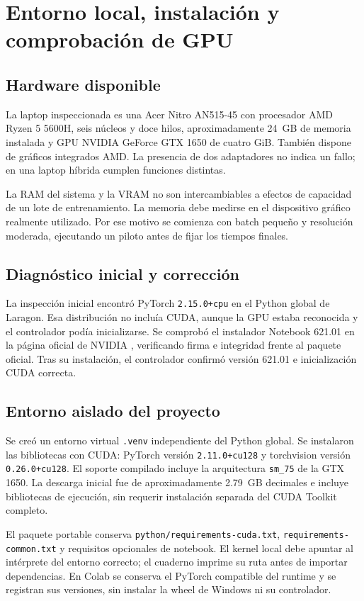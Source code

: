 \FloatBarrier\section{Entorno local, instalación y comprobación de GPU}

\subsection{Hardware disponible}
La laptop inspeccionada es una Acer Nitro AN515-45 con procesador AMD Ryzen 5 5600H, seis núcleos y doce hilos, aproximadamente 24~GB de memoria instalada y GPU NVIDIA GeForce GTX 1650 de cuatro GiB. También dispone de gráficos integrados AMD. La presencia de dos adaptadores no indica un fallo; en una laptop híbrida cumplen funciones distintas.

La RAM del sistema y la VRAM no son intercambiables a efectos de capacidad de un lote de entrenamiento. La memoria debe medirse en el dispositivo gráfico realmente utilizado. Por ese motivo se comienza con batch pequeño y resolución moderada, ejecutando un piloto antes de fijar los tiempos finales.

\subsection{Diagnóstico inicial y corrección}
La inspección inicial encontró PyTorch \texttt{2.15.0+cpu} en el Python global de Laragon. Esa distribución no incluía CUDA, aunque la GPU estaba reconocida y el controlador podía inicializarse. Se comprobó el instalador Notebook 621.01 en la página oficial de NVIDIA \cite{nvidiadriver,acerdrivers}, verificando firma e integridad frente al paquete oficial. Tras su instalación, el controlador confirmó versión 621.01 e inicialización CUDA correcta.

\subsection{Entorno aislado del proyecto}
Se creó un entorno virtual \texttt{.venv} independiente del Python global. Se instalaron las bibliotecas con CUDA: PyTorch versión \texttt{2.11.0+cu128} y torchvision versión \texttt{0.26.0+cu128}. El soporte compilado incluye la arquitectura \texttt{sm\_75} de la GTX 1650. La descarga inicial fue de aproximadamente 2.79~GB decimales e incluye bibliotecas de ejecución, sin requerir instalación separada del CUDA Toolkit completo.

El paquete portable conserva \texttt{python/requirements-cuda.txt}, \texttt{requirements-common.txt} y requisitos opcionales de notebook. El kernel local debe apuntar al intérprete del entorno correcto; el cuaderno imprime su ruta antes de importar dependencias. En Colab se conserva el PyTorch compatible del runtime y se registran sus versiones, sin instalar la wheel de Windows ni su controlador.

